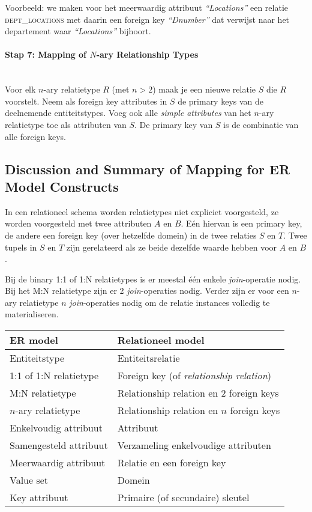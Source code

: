 Voorbeeld: we maken voor het meerwaardig attribuut \textit{``Locations''} een relatie \textsc{dept\_locations} met daarin een foreign key \textit{``Dnumber''} dat verwijst naar het departement waar \textit{``Locations''} bijhoort.

\paragraph{Stap 7: Mapping of $N$-ary Relationship Types}~\vspace{2mm}\\
Voor elk $n$-ary relatietype $R$ (met $n > 2$) maak je een nieuwe relatie $S$ die $R$ voorstelt. Neem als foreign key attributes in $S$ de primary keys van de deelnemende entiteitstypes. Voeg ook alle \textit{simple attributes} van het $n$-ary relatietype toe als attributen van $S$. De primary key van $S$ is de combinatie van alle foreign keys.



\subsection{Discussion and Summary of Mapping for ER Model Constructs}
In een relationeel schema worden relatietypes niet expliciet voorgesteld, ze worden voorgesteld met twee attributen $A$ en $B$. E\'en hiervan is een primary key, de andere een foreign key (over hetzelfde domein) in de twee relaties $S$ en $T$. Twee tupels in $S$ en $T$ zijn gerelateerd als ze beide dezelfde waarde hebben voor $A$ en $B$.

Bij de binary 1:1 of 1:N relatietypes is er meestal \'e\'en enkele \textit{join}-operatie nodig. Bij het M:N relatietype zijn er 2 \textit{join}-operaties nodig. Verder zijn er voor een $n$-ary relatietype $n$ \textit{join}-operaties nodig om de relatie instances volledig te materialiseren.
\begin{center}
\begin{tabular}{l|l}
\textbf{ER model}				& \textbf{Relationeel model} \\ \hline
Entiteitstype					& Entiteitsrelatie \\
1:1 of 1:N relatietype			& Foreign key (of \textit{relationship relation}) \\
M:N relatietype					& Relationship relation en 2 foreign keys \\
$n$-ary relatietype				& Relationship relation en $n$ foreign keys \\
Enkelvoudig attribuut			& Attribuut \\
Samengesteld attribuut			& Verzameling enkelvoudige attributen \\
Meerwaardig attribuut			& Relatie en een foreign key \\
Value set						& Domein \\
Key attribuut					& Primaire (of secundaire) sleutel
\end{tabular}
\end{center}



